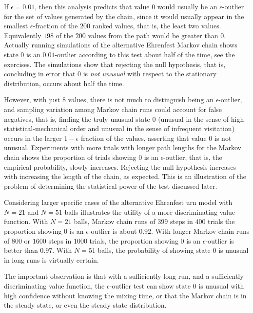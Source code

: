 \documentclass[12pt]{article}
\begin{document}
\begin{example}
    If \( \epsilon = 0.01 \), then this analysis predicts that value \(
    0 \) would usually be an \( \epsilon \)-outlier for the set of
    values generated by the chain, since it would usually appear in the
    smallest \( \epsilon \)-fraction of the \( 200 \) ranked values,
    that is, the least two values.  Equivalently \( 198 \) of the \( 200
    \) values from the path would be greater than \( 0 \).  Actually
    running simulations of the alternative Ehrenfest Markov chain shows
    state \( 0 \) is an \( 0.01 \)-outlier according to this test about
    half of the time, see the exercises.  The simulations show that
    rejecting the null hypothesis, that is, concluding in error that \(
    0 \) is \emph{not unusual} with respect to the stationary
    distribution, occurs about half the time.

    However, with just \( 8 \) values, there is not much to distinguish
    being an \( \epsilon \)-outlier, and sampling variation among Markov
    chain runs could account for false negatives, that is, finding the
    truly unusual state \( 0 \) (unusual in the sense of high
    statistical-mechanical order and unusual in the sense of infrequent
    visitation) occurs in the larger \( 1 - \epsilon \) fraction of the
    values, asserting that value \( 0 \) is not unusual.  Experiments
    with more trials with longer path lengths for the Markov chain shows
    the proportion of trials showing \( 0 \) is an \( \epsilon \)-outlier,
    that is, the empirical probability, slowly increases.  Rejecting the
    null hypothesis increases with increasing the length of the chain,
    as expected.  This is an illustration of the problem of determining
    the statistical power of the test discussed later.

    Considering larger specific cases of the alternative Ehrenfest urn
    model%
    with \( N = 21 \) and \( N = 51 \) balls illustrates the utility of
    a more discriminating value function.  With \( N = 21 \) balls,
    Markov chain runs of \( 399 \) steps in \( 400 \) trials the
    proportion showing \( 0 \) is an \( \epsilon \)-outlier is about \(
    0.92 \).  With longer Markov chain runs of \( 800 \) or \( 1600 \)
    steps in \( 1000 \) trials, the proportion showing \( 0 \) is an \(
    \epsilon \)-outlier is better than \( 0.97 \).  With \( N = 51 \)
    balls, the probability of showing state \( 0 \) is unusual in long
    runs is virtually certain.

    The important observation is that with a sufficiently long run, and
    a sufficiently discriminating value function, the \( \epsilon \)-outlier
    test can show state \( 0 \) is unusual with high confidence without
    knowing the mixing time, or that the Markov chain is in the steady
    state, or even the steady state distribution.

\end{example}
\end{document}
